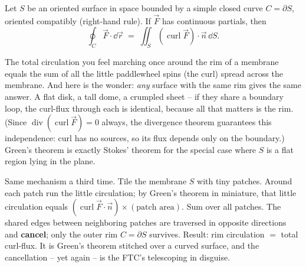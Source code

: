 \begin{theorem}
\label{ch35:thm-stokes}
Let $S$ be an oriented surface in space bounded by a simple closed curve
$C=\partial S$, oriented compatibly (right-hand rule). If $\vec F$ has continuous
partials, then
\[
  \oint_C \vec F\cdot\dd\vec r \;=\; \iint_S (\operatorname{curl}\vec F)\cdot\vec n\,\dd S.
\]
\end{theorem}

\begin{intuitionbox}
The total circulation you feel marching once around the rim of a membrane equals
the sum of all the little paddlewheel spins (the curl) spread across the membrane.
And here is the wonder: \emph{any} surface with the same rim gives the same answer.
A flat disk, a tall dome, a crumpled sheet -- if they share a boundary loop, the
curl-flux through each is identical, because all that matters is the rim. (Since
$\operatorname{div}(\operatorname{curl}\vec F)=0$ always, the divergence theorem
guarantees this independence: curl has no sources, so its flux depends only on the
boundary.) Green's theorem is exactly Stokes' theorem for the special case where
$S$ is a flat region lying in the plane.
\end{intuitionbox}

\begin{happeningbox}
Same mechanism a third time. Tile the membrane $S$ with tiny patches. Around each
patch run the little circulation; by Green's theorem in miniature, that little
circulation equals $(\operatorname{curl}\vec F\cdot\vec n)\times(\text{patch area})$.
Sum over all patches. The shared edges between neighboring patches are traversed in
opposite directions and \textbf{cancel}; only the outer rim $C=\partial S$ survives.
Result: rim circulation $=$ total curl-flux. It is Green's theorem stitched over a
curved surface, and the cancellation -- yet again -- is the FTC's telescoping in
disguise.
\end{happeningbox}

